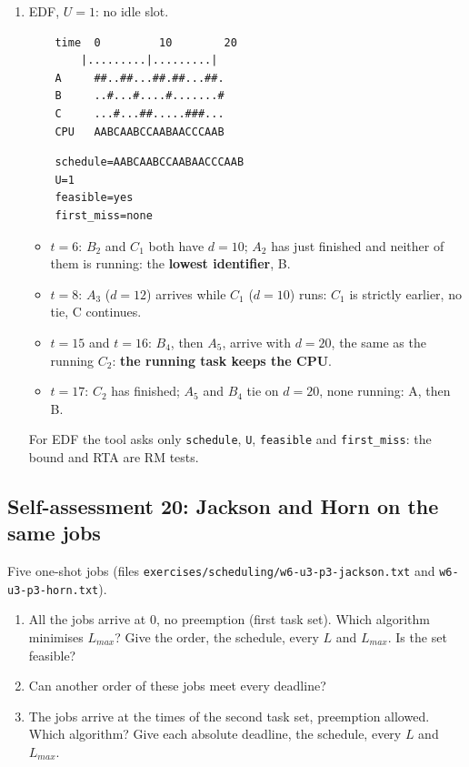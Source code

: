 \begin{enumerate}
    A and B leave C one slot out of every four: $C_1$ runs at 3, 7 and 11 and finishes at 12, two units late (a late job keeps running, so $C_1$ still uses slot 11). $C_2$ (released at 10) runs at 14, 18 and 19, and finishes at 20, just in time.
    \item EDF, $U = 1$: no idle slot.
\begin{verbatim}
    time  0         10        20
        |.........|.........|
    A     ##..##...##.##...##.
    B     ..#...#....#.......#
    C     ...#...##.....###...
    CPU   AABCAABCCAABAACCCAAB
\end{verbatim}
\begin{verbatim}
    schedule=AABCAABCCAABAACCCAAB
    U=1
    feasible=yes
    first_miss=none
\end{verbatim}
    \begin{itemize}
        \item $t = 6$: $B_2$ and $C_1$ both have $d = 10$; $A_2$ has just finished and neither of them is running: the \textbf{lowest identifier}, B.
        \item $t = 8$: $A_3$ ($d = 12$) arrives while $C_1$ ($d = 10$) runs: $C_1$ is strictly earlier, no tie, C continues.
        \item $t = 15$ and $t = 16$: $B_4$, then $A_5$, arrive with $d = 20$, the same as the running $C_2$: \textbf{the running task keeps the CPU}.
        \item $t = 17$: $C_2$ has finished; $A_5$ and $B_4$ tie on $d = 20$, none running: A, then B.
    \end{itemize}
    For EDF the tool asks only \texttt{schedule}, \texttt{U}, \texttt{feasible} and \texttt{first\_miss}: the bound and RTA are RM tests.
\end{enumerate}

\subsection*{Self-assessment 20: Jackson and Horn on the same jobs}
Five one-shot jobs (files \texttt{exercises/scheduling/w6-u3-p3-jackson.txt} and \texttt{w6-u3-p3-horn.txt}).
\begin{enumerate}
    \item All the jobs arrive at 0, no preemption (first task set). Which algorithm minimises $L_{max}$? Give the order, the schedule, every $L$ and $L_{max}$. Is the set feasible?
    \item Can another order of these jobs meet every deadline?
    \item The jobs arrive at the times of the second task set, preemption allowed. Which algorithm? Give each absolute deadline, the schedule, every $L$ and $L_{max}$.
\end{enumerate}

